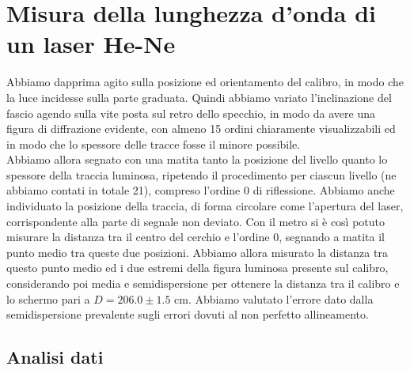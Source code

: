 \section{Misura della lunghezza d'onda di un laser He-Ne}

Abbiamo dapprima agito sulla posizione ed orientamento del calibro, in modo che la luce incidesse sulla parte graduata. Quindi abbiamo variato l'inclinazione del fascio agendo sulla vite posta sul retro dello specchio, in modo da avere una figura di diffrazione evidente, con almeno 15 ordini chiaramente visualizzabili ed in modo che lo spessore delle tracce fosse il minore possibile.\\
Abbiamo allora segnato con una matita tanto la posizione del livello quanto lo spessore della traccia luminosa, ripetendo il procedimento per ciascun livello (ne abbiamo contati in totale 21), compreso l'ordine 0 di riflessione. Abbiamo anche individuato la posizione della traccia, di forma circolare come l'apertura del laser, corrispondente alla parte di segnale non deviato. Con il metro si è così potuto misurare la distanza tra il centro del cerchio e l'ordine 0, segnando a matita il punto medio tra queste due posizioni. Abbiamo allora misurato la distanza tra questo punto medio ed i due estremi della figura luminosa presente sul calibro, considerando poi media e semidispersione per ottenere la distanza tra il calibro e lo schermo pari a $D = 206.0 \pm 1.5$ cm. Abbiamo valutato l'errore dato dalla semidispersione prevalente sugli errori dovuti al non perfetto allineamento.

\subsection{Analisi dati}

